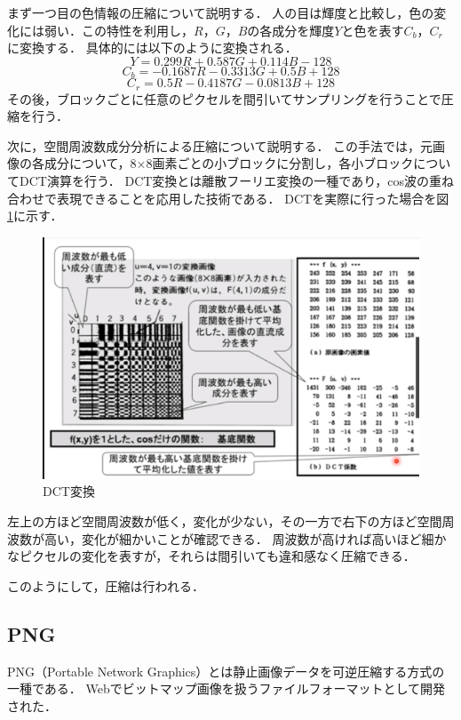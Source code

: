 \documentclass[a4paper,11pt]{bxjsarticle}
\begin{document}
まず一つ目の色情報の圧縮について説明する．
人の目は輝度と比較し，色の変化には弱い．この特性を利用し，$R$，$G$，$B$の各成分を輝度$Y$と色を表す$C_b$，$C_r$に変換する．
具体的には以下のように変換される．\cite{jpeg2}
\begin{equation}
  Y = 0.299R + 0.587G + 0.114B - 128
\end{equation}
\begin{equation}
  C_b = - 0.1687R - 0.3313G + 0.5B + 128
\end{equation}
\begin{equation}
  C_r = 0.5R - 0.4187G - 0.0813B + 128
\end{equation}
その後，ブロックごとに任意のピクセルを間引いてサンプリングを行うことで圧縮を行う．

次に，空間周波数成分分析による圧縮について説明する．
この手法では，元画像の各成分について，8×8画素ごとの小ブロックに分割し，各小ブロックについてDCT演算を行う．
DCT変換とは離散フーリエ変換の一種であり，cos波の重ね合わせで表現できることを応用した技術である．
DCTを実際に行った場合を図\ref{fig:dct}に示す．\cite{jpeg1}

\begin{figure}[htbp]
  \centering  %
  \includegraphics[clip,width = 12.0cm]{dct_con.eps}
  \caption{DCT変換}
  \label{fig:dct}
  \end{figure}

左上の方ほど空間周波数が低く，変化が少ない，その一方で右下の方ほど空間周波数が高い，変化が細かいことが確認できる．
周波数が高ければ高いほど細かなピクセルの変化を表すが，それらは間引いても違和感なく圧縮できる．

このようにして，圧縮は行われる．

\subsection{PNG}
PNG（Portable Network Graphics）とは静止画像データを可逆圧縮する方式の一種である．
Webでビットマップ画像を扱うファイルフォーマットとして開発された．
\end{document}
